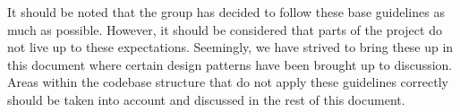 It should be noted that the group has decided to follow these base guidelines as much as possible. However, it should be considered that parts of the project do not live up to these expectations. Seemingly, we have strived to bring these up in this document where certain design patterns have been brought up to discussion. Areas within the codebase structure that do not apply these guidelines correctly should be taken into account and discussed in the rest of this document.